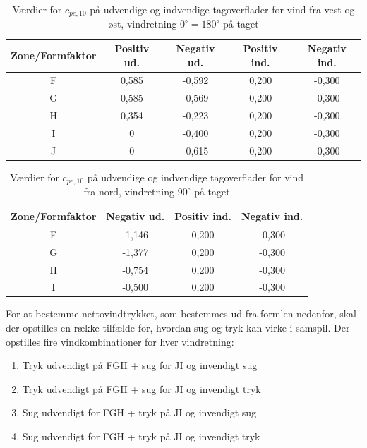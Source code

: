 \begin{table}[htb]
	\begin{center}
		\begin{tabular}{ |c|c|c|c|c| } 
			\hline
			Zone/Formfaktor & Positiv ud.& Negativ ud. & Positiv ind. & Negativ ind. \\	\hline
			F & 0,585 & -0,592 & 0,200 & -0,300 \\	\hline
			G & 0,585 & -0,569 & 0,200 & -0,300 \\	\hline 
			H & 0,354 & -0,223 & 0,200 & -0,300 \\ 	\hline
			I & 0 & -0,400 & 0,200 & -0,300 \\	\hline
			J & 0 & -0,615 & 0,200 & -0,300 \\	\hline
		\end{tabular}
		\caption{Værdier for $c_{pe,10}$ på udvendige og indvendige tagoverflader for vind fra vest og øst, vindretning $0^{\circ} = 180^{\circ}$ på taget}
		\label{tab:cc}
	\end{center}
\end{table}

\begin{table}[htb]
	\begin{center}
		\begin{tabular}{ |c|c|c|c| } 
			\hline
			Zone/Formfaktor & Negativ ud. & Positiv ind. & Negativ ind. \\	\hline
			F & -1,146 & 0,200 & -0,300 \\	\hline
			G & -1,377 & 0,200 & -0,300 \\	\hline 
			H & -0,754 & 0,200 & -0,300 \\ 	\hline
			I & -0,500 & 0,200 & -0,300 \\	\hline
		\end{tabular}
		\caption{Værdier for $c_{pe,10}$ på udvendige og indvendige tagoverflader for vind fra nord, vindretning $90^{\circ}$ på taget}
		\label{tab:kk}
	\end{center}
\end{table}

For at bestemme nettovindtrykket, som bestemmes ud fra formlen nedenfor, skal der opstilles en række tilfælde for, hvordan sug og tryk kan virke i samspil.
\newline
\newline
Der opstilles fire vindkombinationer for hver vindretning:
\begin{enumerate}
	\item Tryk udvendigt på FGH + sug for JI og invendigt sug
	\item Tryk udvendigt på FGH + sug for JI og invendigt tryk
	\item Sug udvendigt for FGH + tryk på JI og invendigt sug
	\item Sug udvendigt for FGH + tryk på JI og invendigt tryk
\end{enumerate}

